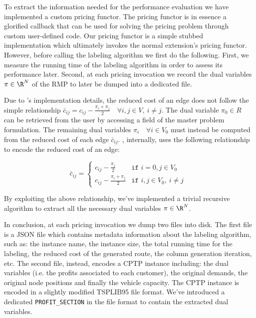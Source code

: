 To extract the information needed for the performance evaluation we have implemented a custom pricing functor.
The pricing functor is in essence a glorified callback that can be used
for solving the pricing problem through custom user-defined code.
Our pricing functor is a simple stubbed implementation which ultimately invokes
the normal \vrpsolver{} extension's pricing functor.
However, before calling the labeling algorithm we first do the following.
First, we measure the running time of the labeling algorithm in order to assess its performance later.
Second, at each pricing invocation we record the dual variables $\pi \in \R^N$ of the RMP
to later be dumped into a dedicated file.

Due to \bapcod{}'s implementation details, the reduced cost of an
edge does not follow the simple relationship $\bar{c}_{ij} = c_{ij} - \frac{\pi_i + \pi_j}{2} \quad \forall i, j \in V,\ i \ne j$.
The dual variable $\pi_0 \in R$ can be retrieved from the user by accessing a field
of the master problem formulation.
The remaining dual variables $\pi_i \quad \forall i \in V_0$ must instead be computed
from the reduced cost of each edge $\bar{c}_{ij}$.
\bapcod{}, internally, uses the following relationship to encode the reduced cost of an edge:

\begin{equation}
	\bar{c}_{ij} = \begin{cases}
		c_{ij} - \frac{\pi_{j}}{2}       & \texttt{if } i = 0, j \in V_0       \\
		c_{ij} - \frac{\pi_i + \pi_j}{2} & \texttt{if } i, j \in V_0,\ i \ne j
	\end{cases}
\end{equation}

By exploiting the above relationship, we've implemented a trivial recursive algorithm
to extract all the necessary dual variables $\pi \in \R^N$.

In conclusion, at each pricing invocation we dump two files into disk.
The first file is a JSON file which contains metadata information about
the labeling algorithm, such as: the instance name, the instance size,
the total running time for the labeling, the reduced cost of the generated route,
the column generation iteration, etc.
The second file, instead, encodes a CPTP instance including:
the dual variables (i.e. the profits associated to each customer),
the original demands, the original node positions and finally the vehicle capacity.
The CPTP instance is encoded in a slightly modified TSPLIB95 file format.
We've introduced a dedicated \texttt{PROFIT\_SECTION} in the file format
to contain the extracted dual variables.

